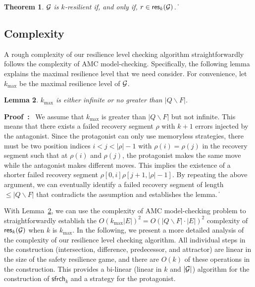 \documentclass[times,10pt,twocolumn]{article}
\newtheorem{theorem}{Theorem}
\newtheorem{lemma}[theorem]{Lemma}
\newcommand\res{\mathsf{res}}
\newcommand\safe{\mathsf{sfrch}}
\newcommand\qed{\hfill\ensuremath{\Box}}
\newcommand{\pf}{\noindent\mbox{\bf Proof : }}
\newcommand{\calg}{{\cal G}}
\def\qed{\ifmmode\|\else{\unskip\nobreak\hfil
\penalty50\hskip1em\null\nobreak\hfil$\blacksquare$
\parfillskip=0pt\finalhyphendemerits=0\endgraf}\fi}
\begin{document}
\begin{theorem}
\label{theorem:main} 
$\calg$ is $k$-resilient if, and only if, $r\in \res_k(\calg)$.  
\qed 
\end{theorem}




\subsection{Complexity}

A rough complexity of our resilience level checking algorithm 
straightforwardly follows the complexity of AMC model-checking.  
Specifically, the following lemma explains the maximal resilience level that we need consider. 
\label{reply2.maximal.k}
For convenience, let $k_{\max}$ be the maximal resilience level of $\calg$.  

\begin{lemma} \label{lemma.kmax} 
$k_{\max}$ is either infinite or no greater than $|Q\smallsetminus F|$.  
\end{lemma} 
\pf 
We assume that $k_{\max}$ is greater than $|Q\smallsetminus F|$ but not infinite. 
This means that there exists a failed recovery segment $\rho$ 
with $k+1$ errors injected by the antagonist. 
Since the protagonist can only use memoryless strategies, 
there must be two position indices $i<j<|\rho|-1$ with $\rho(i)=\rho(j)$ in the recovery segment 
such that at $\rho(i)$ and $\rho(j)$, 
the protagonist makes the same move while the antagonist makes different moves. 
This implies the existence of a shorter failed recovery segment $\rho[0,i]\rho[j+1,|\rho|-1]$.  
By repeating the above argument, we can eventually identify a failed recovery segment of length 
$\leq |Q\smallsetminus F|$ that contradicts the assumption and establishes the lemma. 
\qed 

With Lemma~\ref{lemma.kmax}, we can use the complexity of AMC model-checking problem \cite{AHK02} 
to 
straightforwardly establish the $O(k_{\max} |E|)^2=O(|Q\smallsetminus F|\cdot|E|)^2$ complexity of 
$\res_k(\calg)$ when $k$ is $k_{\max}$.  
In the following, we present a more detailed analysis of the complexity of our 
resilience level checking algorithm. 
All individual steps in the construction 
(intersection, difference, predecessor, and attractor) 
are linear in the 
size of the safety resilience game, and 
there are $O(k)$ of these 
operations in the construction.  
This provides a bi-linear (linear in $k$ and $|\calg|$) 
algorithm for the construction of $\safe_k$ and 
a strategy for the protagonist.  
\end{document}
